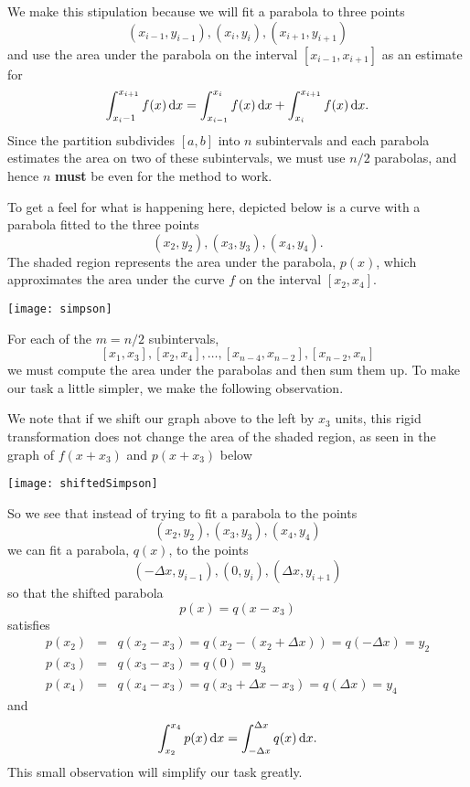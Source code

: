 \documentclass[reqno, 12pt]{amsart}
\begin{document}
We make this stipulation because we will fit a parabola to three points
\[(x_{i-1}, y_{i-1}), (x_i, y_i), (x_{i+1},y_{i+1})\]
and use the area under the parabola on the interval \([x_{i-1}, x_{i+1}]\) as an estimate for
\[\int_{x_i-1}^{x_{i+1}} f(x)\dif x = \int_{x_{i-1}}^{x_i} f(x)\dif x + \int_{x_i}^{x_{i+1}}f(x)\dif x.\]
Since the partition subdivides \([a,b]\) into \(n\) subintervals and each parabola estimates the area on two of these subintervals, we must use \(n/2\) parabolas, and hence \(n\) \textbf{must} be even for the method to work.

To get a feel for what is happening here, depicted below is a curve with a parabola fitted to the three points
\[(x_2,y_2), (x_3,y_3), (x_4,y_4).\]
The shaded region represents the area under the parabola, \(p(x)\), which approximates the area under the curve \(f\) on the interval \([x_2,x_4]\).
\begin{center}
  \texttt{[image: simpson]}
\end{center}
For each of the \(m = n/2\) subintervals,
\[[x_1, x_3], [x_2,x_4], \ldots, [x_{n-4}, x_{n-2}], [x_{n-2}, x_n]\]
we must compute the area under the parabolas and then sum them up.
To make our task a little simpler, we make the following observation.

We note that if we shift our graph above to the left by \(x_3\) units, this rigid transformation does not change the area of the shaded region, as seen in the graph of \(f(x + x_3)\) and \(p(x + x_3)\) below
\begin{center}
  \texttt{[image: shiftedSimpson]}
\end{center}
So we see that instead of trying to fit a parabola to the points
\[(x_{2}, y_{2}), (x_3, y_3), (x_{4}, y_{4})\]
we can fit a parabola, \(q(x)\), to the points
\[(-\Delta x, y_{i-1}), (0, y_i), (\Delta x, y_{i+1})\]
so that the shifted parabola
\[p(x) = q(x - x_3)\]
satisfies
\begin{eqnarray*}
  p(x_2) &=& q(x_2 - x_3) = q(x_2 - (x_2 + \Delta x)) = q(-\Delta x) = y_2\\
  p(x_3) &=& q(x_3 - x_3) = q(0) = y_3\\
  p(x_4) &=& q(x_4 - x_3) = q(x_3 + \Delta x - x_3) = q(\Delta x) = y_4
\end{eqnarray*}
and
\[\int_{x_2}^{x_4} p(x)\dif x = \int_{-\Delta x}^{\Delta x} q(x)\dif x.\]
This small observation will simplify our task greatly.
\end{document}
